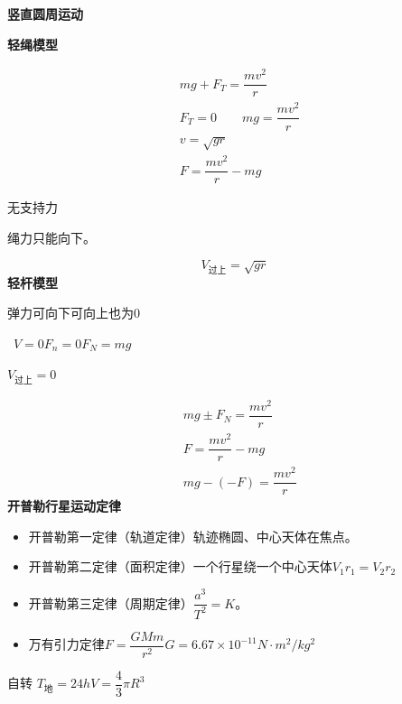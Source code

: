 \textbf{竖直圆周运动}

\textbf{轻绳模型}


\begin{align*}
& mg+F_T=\dfrac{mv^2}{r}\\
& F_T=0\qquad mg=\dfrac{mv^2}{r}\\
& v=\sqrt{gr}\\
& F=\dfrac{mv^2}{r}-mg
\end{align*}

无支持力

绳力只能向下。

\[ V_{\text{过上}}=\sqrt{gr} \]
\textbf{轻杆模型}


弹力可向下\quad 可向上\quad 也为0

\ $V=0$\quad $F_n=0$\quad $F_N=mg$

$V_{\text{过上}}=0$


\begin{align*}
& mg\pm F_N=\dfrac{mv^2}{r}\\
& F=\dfrac{mv^2}{r}-mg\\
& mg-(-F)=\dfrac{mv^2}{r}
\end{align*}
\textbf{开普勒行星运动定律}
\begin{itemize}
  \item 开普勒第一定律（轨道定律）\quad 轨迹椭圆、中心天体在焦点。
  \item 开普勒第二定律（面积定律）\quad 一个行星绕一个中心天体\quad $V_1r_1=V_2r_2$
  \item 开普勒第三定律（周期定律）\quad $\dfrac{a^3}{T^2}=K$。
  \item 万有引力定律\quad $F=\dfrac{GMm}{r^2}$\quad $G=6.67\times10^{-11}\unit{N\cdot m^2/kg^2}$
\end{itemize}
自转 $T_{\text{地}}=24\unit{h}$\quad $V=\dfrac{4}{3}\pi R^3$

